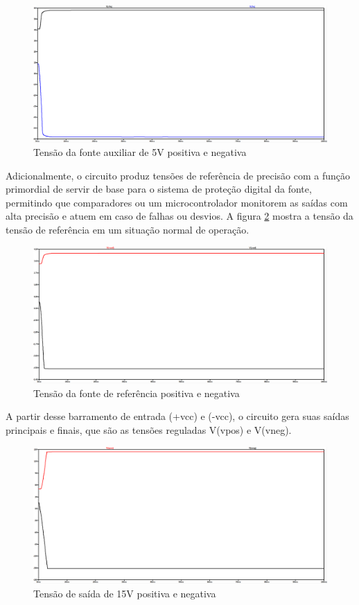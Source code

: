\documentclass[
	12pt,				%
	oneside,			%
	a4paper,			%
	chapter=TITLE,
	sumario=tradicional,
	english,			%
	brazil				%
]{abntex2}
\begin{document}
\begin{figure}[H]
    \centering
    \includegraphics[width=0.9\linewidth]{images/simulacao/tensao_fonte_5V.png}
    \caption{Tensão da fonte auxiliar de 5V positiva e negativa}
    \label{fig:tensao_fonte_5V}
\end{figure}

Adicionalmente, o circuito produz tensões de referência de precisão com a função primordial de servir de base para o sistema de proteção digital da fonte, permitindo que comparadores ou um microcontrolador monitorem as saídas com alta precisão e atuem em caso de falhas ou desvios. A figura \ref{fig:tensao_fonte_ref} mostra a tensão da tensão de referência em um situação normal de operação.

\begin{figure}[H]
    \centering
    \includegraphics[width=0.9\linewidth]{images/simulacao/tensao_fonte_ref.png}
    \caption{Tensão da fonte de referência positiva e negativa}
    \label{fig:tensao_fonte_ref}
\end{figure}

A partir desse barramento de entrada (+vcc) e (-vcc), o circuito gera suas saídas principais e finais, que são as tensões reguladas V(vpos) e V(vneg). 

\begin{figure}[H]
    \centering
    \includegraphics[width=0.9\linewidth]{images/simulacao/tensao_15_cc.png}
    \caption{Tensão de saída de 15V positiva e negativa}
    \label{fig:tensao_15_cc}
\end{figure}
\end{document}
